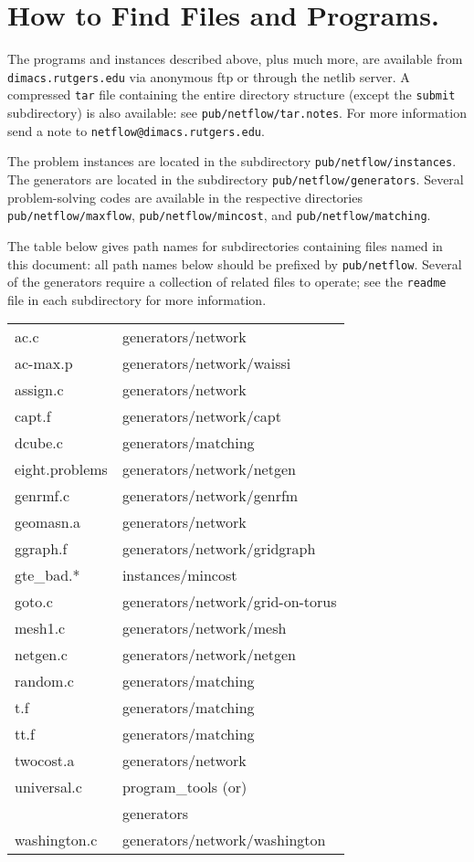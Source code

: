 \section{How to Find Files and Programs.}

The programs and instances described above, plus 
much more, are available from {\tt dimacs.rutgers.edu} via 
anonymous ftp or through the netlib server.   
A compressed {\tt tar} file containing
the entire directory structure (except the {\tt submit} subdirectory)
is also available:  see {\tt pub/netflow/tar.notes}. 
For more information send a note to {\tt netflow@dimacs.rutgers.edu}. 

The problem instances are located in the subdirectory 
{\tt pub/netflow/instances}.  The generators are located in the
subdirectory {\tt pub/netflow/generators}.  Several problem-solving
codes are available in the respective 
directories {\tt pub/netflow/maxflow}, {\tt pub/netflow/mincost},
and {\tt pub/netflow/matching}.  

The table below gives path names for subdirectories containing
files named in this document: all path names below should be prefixed by 
{\tt pub/netflow}.   Several of the generators require a collection 
of related files to operate; see the
{\tt readme } file in each subdirectory for more information.

\vspace{.5in}

\begin{tabular}{ll} \hline
ac.c    	& generators/network\\
ac-max.p   	& generators/network/waissi \\
assign.c        & generators/network \\ 
capt.f 		& generators/network/capt \\
dcube.c  	& generators/matching \\
eight.problems  & generators/network/netgen \\
genrmf.c        & generators/network/genrfm \\
geomasn.a  	& generators/network \\
ggraph.f 	& generators/network/gridgraph \\
gte\_bad.*     & instances/mincost \\
goto.c		& generators/network/grid-on-torus \\ 
mesh1.c 	& generators/network/mesh \\ 
netgen.c 	& generators/network/netgen \\
random.c 	& generators/matching \\
t.f 		& generators/matching \\
tt.f 		& generators/matching \\
twocost.a       & generators/network \\ 
universal.c     & program\_tools  (or) \\
                & generators  \\      
washington.c    & generators/network/washington \\ \hline
\end{tabular}

